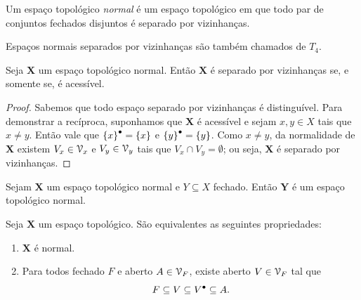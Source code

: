 \begin{definition}
Um espaço topológico \emph{normal} é um espaço topológico
em que todo par de conjuntos fechados disjuntos é separado por vizinhanças.
\end{definition}

Espaços normais separados por vizinhanças são também chamados de $T_4$.

\begin{proposition}
Seja $\bm X$ um espaço topológico normal. Então $\bm X$ é separado por vizinhanças se, e somente se, é acessível.
\end{proposition}
\begin{proof}
Sabemos que todo espaço separado por vizinhanças é distinguível. Para demonstrar a recíproca, suponhamos que $\bm X$ é acessível e sejam $x,y \in X$ tais que $x \neq y$. Então vale que ${\{x\}}^\bullet=\{x\}$ e ${\{y\}}^\bullet=\{y\}$. Como $x \neq y$, da normalidade de $\bm X$ existem $V_x \in \mathcal{V}_x$ e $V_y \in \mathcal{V}_y$ tais que $V_x \cap V_y = \emptyset$; ou seja, $\bm X$ é separado por vizinhanças.
\end{proof}

\begin{proposition}
Sejam $\bm X$ um espaço topológico normal e $Y \subseteq X$ fechado. Então $\bm Y$ é um espaço topológico normal.
\end{proposition}

\begin{proposition}
Seja $\bm X$ um espaço topológico. São equivalentes as seguintes propriedades:
	\begin{enumerate}
	\item $\bm X$ é normal.
	\item Para todos fechado $F$ e aberto $A \in \mathcal{V}_F$, existe aberto $V \in \mathcal{V}_F$ tal que
		\begin{equation*}
		F \subseteq V \subseteq {V}^\bullet \subseteq A.
		\end{equation*}
	\end{enumerate}
\end{proposition}

